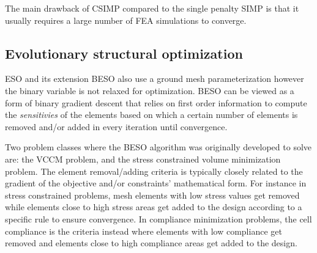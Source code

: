 The main drawback of CSIMP compared to the single penalty SIMP is that it usually requires a large number of FEA simulations to converge. 




\subsection{Evolutionary structural optimization}

ESO and its extension BESO also use a ground mesh parameterization however the binary variable is not relaxed for optimization. BESO can be viewed as a form of binary gradient descent that relies on first order information to compute the \textit{sensitivies} of the elements based on which a certain number of elements is removed and/or added in every iteration until convergence.

Two problem classes where the BESO algorithm was originally developed to solve are: the VCCM problem, and the stress constrained volume minimization problem. The element removal/adding criteria is typically closely related to the gradient of the objective and/or constraints' mathematical form. For instance in stress constrained problems, mesh elements with low stress values get removed while elements close to high stress areas get added to the design according to a specific rule to ensure convergence. In compliance minimization problems, the cell compliance is the criteria instead where elements with low compliance get removed and elements close to high compliance areas get added to the design.

